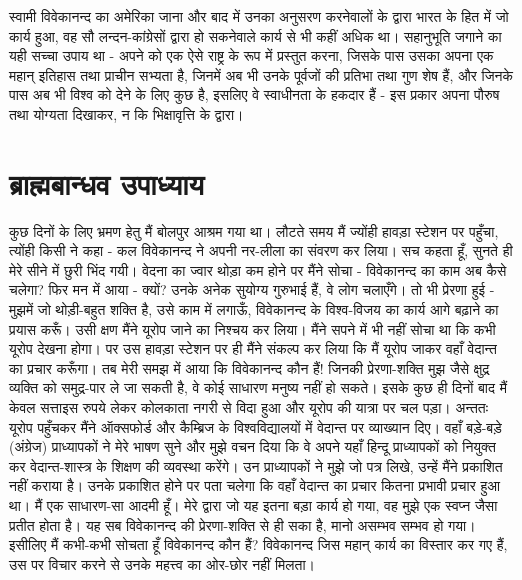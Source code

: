 \newpage

स्वामी विवेकानन्द का अमेरिका जाना और बाद में उनका अनुसरण करनेवालों के द्वारा भारत के हित में जो कार्य हुआ, वह सौ लन्दन-कांग्रेसों द्वारा हो सकनेवाले कार्य से भी कहीं अधिक था। सहानुभूति जगाने का यही सच्चा उपाय था - अपने को एक ऐसे राष्ट्र के रूप में प्रस्तुत करना, जिसके पास उसका अपना एक महान् इतिहास तथा प्राचीन सभ्यता है, जिनमें अब भी उनके पूर्वजों की प्रतिभा तथा गुण शेष हैं, और जिनके पास अब भी विश्व को देने के लिए कुछ है, इसलिए वे स्वाधीनता के हकदार हैं - इस प्रकार अपना पौरुष तथा योग्यता दिखाकर, न कि भिक्षावृत्ति के द्वारा।


\section*{ब्राह्मबान्धव उपाध्याय}


कुछ दिनों के लिए भ्रमण हेतु मैं बोलपुर आश्रम गया था। लौटते समय मैं ज्योंही हावड़ा स्टेशन पर पहुँचा, त्योंही किसी ने कहा - कल विवेकानन्द ने अपनी नर-लीला का संवरण कर लिया। सच कहता हूँ, सुनते ही मेरे सीने में छुरी भिंद गयी। वेदना का ज्वार थोड़ा कम होने पर मैंने सोचा - विवेकानन्द का काम अब कैसे चलेगा? फिर मन में आया - क्यों? उनके अनेक सुयोग्य गुरुभाई हैं, वे लोग चलाएँगे। तो भी प्रेरणा हुई - मुझमें जो थोड़ी-बहुत शक्ति है, उसे काम में लगाऊँ, विवेकानन्द के विश्व-विजय का कार्य आगे बढ़ाने का प्रयास करूँ। उसी क्षण मैंने यूरोप जाने का निश्चय कर लिया। मैंने सपने में भी नहीं सोचा था कि कभी यूरोप देखना होगा। पर उस हावड़ा स्टेशन पर ही मैंने संकल्प कर लिया कि मैं यूरोप जाकर वहाँ वेदान्त का प्रचार करूँगा। तब मेरी समझ में आया कि विवेकानन्द कौन हैं! जिनकी प्रेरणा-शक्ति मुझ जैसे क्षुद्र व्यक्ति को समुद्र-पार ले जा सकती है, वे कोई साधारण मनुष्य नहीं हो सकते। इसके कुछ ही दिनों बाद मैं केवल सत्ताइस रुपये लेकर कोलकाता नगरी से विदा हुआ और यूरोप की यात्रा पर चल पड़ा। अन्ततः यूरोप पहुँचकर मैंने ऑक्सफोर्ड और कैम्ब्रिज के विश्वविद्यालयों में वेदान्त पर व्याख्यान दिए। वहाँ बड़े-बड़े (अंग्रेज) प्राध्यापकों ने मेरे भाषण सुने और मुझे वचन दिया कि वे अपने यहाँ हिन्दू प्राध्यापकों को नियुक्त कर वेदान्त-शास्त्र के शिक्षण की व्यवस्था करेंगे। उन प्राध्यापकों ने मुझे जो पत्र लिखे, उन्हें मैंने प्रकाशित नहीं कराया है। उनके प्रकाशित होने पर पता चलेगा कि वहाँ वेदान्त का प्रचार कितना प्रभावी प्रचार हुआ था। मैं एक साधारण-सा आदमी हूँ। मेरे द्वारा जो यह इतना बड़ा कार्य हो गया, वह मुझे एक स्वप्न जैसा प्रतीत होता है। यह सब विवेकानन्द की प्रेरणा-शक्ति से ही सका है, मानो असम्भव सम्भव हो गया। इसीलिए मैं कभी-कभी सोचता हूँ विवेकानन्द कौन हैं? विवेकानन्द जिस महान् कार्य का विस्तार कर गए हैं, उस पर विचार करने से उनके महत्त्व का ओर-छोर नहीं मिलता। 

